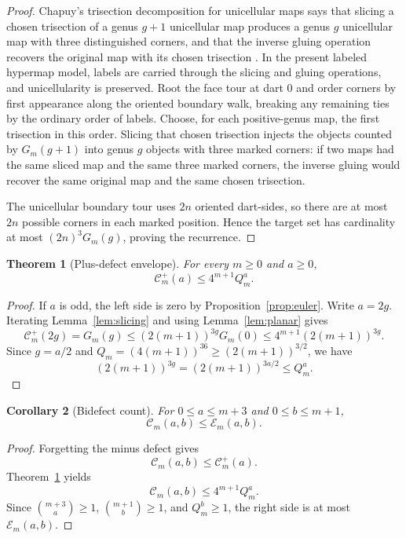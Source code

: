 \documentclass[11pt]{article}
\numberwithin{equation}{section}
\newtheorem{theorem}{Theorem}[section]
\newtheorem{corollary}[theorem]{Corollary}
\newcommand{\Count}{\mathcal C}
\newcommand{\Countp}{\mathcal C^{+}}
\newcommand{\Env}{\mathcal E}
\newcommand{\Loss}{Q}
\begin{document}
\begin{proof}
Chapuy's trisection decomposition for unicellular maps says that slicing a
chosen trisection of a genus \(g+1\) unicellular map produces a genus \(g\)
unicellular map with three distinguished corners, and that the inverse gluing
operation recovers the original map with its chosen trisection
\cite{chapuy_new_2011}.  In the present labeled hypermap model, labels are carried
through the slicing and gluing operations, and unicellularity is preserved.
Root the face tour at dart \(0\) and order corners by first appearance along
the oriented boundary walk, breaking any remaining ties by the ordinary order
of labels.  Choose, for each positive-genus map, the first trisection in this
order.  Slicing that chosen trisection injects the objects counted by
\(G_m(g+1)\) into genus \(g\) objects with three marked corners: if two maps
had the same sliced map and the same three marked corners, the inverse gluing
would recover the same original map and the same chosen trisection.

The unicellular boundary tour uses \(2n\) oriented dart-sides, so there are at
most \(2n\) possible corners in each marked position.  Hence the target set
has cardinality at most \((2n)^3G_m(g)\), proving the recurrence.
\end{proof}

\begin{theorem}[Plus-defect envelope]\label{thm:plus-envelope}
For every \(m\ge0\) and \(a\ge0\),
\[
  \Countp_m(a)\le 4^{m+1}\Loss_m^a.
\]
\end{theorem}

\begin{proof}
If \(a\) is odd, the left side is zero by Proposition~\ref{prop:euler}.
Write \(a=2g\).  Iterating Lemma~\ref{lem:slicing} and using
Lemma~\ref{lem:planar} gives
\[
  \Countp_m(2g)=G_m(g)
  \le
  (2(m+1))^{3g}G_m(0)
  \le
  4^{m+1}(2(m+1))^{3g}.
\]
Since \(g=a/2\) and \(\Loss_m=(4(m+1))^{36}\ge(2(m+1))^{3/2}\), we have
\[
  (2(m+1))^{3g}=(2(m+1))^{3a/2}\le \Loss_m^a.
\]
\end{proof}

\begin{corollary}[Bidefect count]\label{cor:bidefect-count}
For \(0\le a\le m+3\) and \(0\le b\le m+1\),
\[
  \Count_m(a,b)\le \Env_m(a,b).
\]
\end{corollary}

\begin{proof}
Forgetting the minus defect gives
\[
  \Count_m(a,b)\le \Countp_m(a).
\]
Theorem~\ref{thm:plus-envelope} yields
\[
  \Count_m(a,b)\le 4^{m+1}\Loss_m^a.
\]
Since \(\binom{m+3}{a}\ge1\), \(\binom{m+1}{b}\ge1\), and
\(\Loss_m^b\ge1\), the right side is at most \(\Env_m(a,b)\).
\end{proof}
\end{document}
